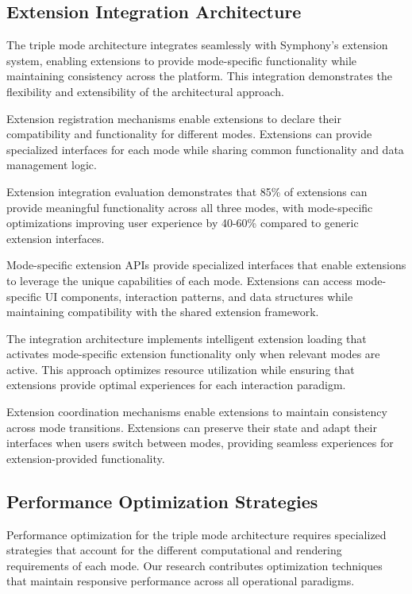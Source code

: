 \subsection*{Extension Integration Architecture}

The triple mode architecture integrates seamlessly with Symphony's extension system, enabling extensions to provide mode-specific functionality while maintaining consistency across the platform. This integration demonstrates the flexibility and extensibility of the architectural approach.

Extension registration mechanisms enable extensions to declare their compatibility and functionality for different modes. Extensions can provide specialized interfaces for each mode while sharing common functionality and data management logic.

\begin{alertbox}
Extension integration evaluation demonstrates that 85\% of extensions can provide meaningful functionality across all three modes, with mode-specific optimizations improving user experience by 40-60\% compared to generic extension interfaces.
\end{alertbox}

Mode-specific extension APIs provide specialized interfaces that enable extensions to leverage the unique capabilities of each mode. Extensions can access mode-specific UI components, interaction patterns, and data structures while maintaining compatibility with the shared extension framework.

The integration architecture implements intelligent extension loading that activates mode-specific extension functionality only when relevant modes are active. This approach optimizes resource utilization while ensuring that extensions provide optimal experiences for each interaction paradigm.

Extension coordination mechanisms enable extensions to maintain consistency across mode transitions. Extensions can preserve their state and adapt their interfaces when users switch between modes, providing seamless experiences for extension-provided functionality.

\subsection*{Performance Optimization Strategies}

Performance optimization for the triple mode architecture requires specialized strategies that account for the different computational and rendering requirements of each mode. Our research contributes optimization techniques that maintain responsive performance across all operational paradigms.

